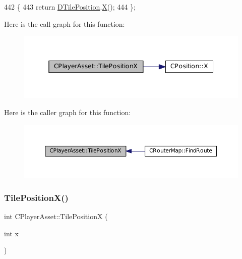 \begin{DoxyCode}
442                                  \{
443             \textcolor{keywordflow}{return} \hyperlink{classCPlayerAsset_a5b59a9d3b7db8c7fa194b80dafb96186}{DTilePosition}.\hyperlink{classCPosition_a9a6b94d3b91df1492d166d9964c865fc}{X}();  
444         \};
\end{DoxyCode}
Here is the call graph for this function\+:\nopagebreak
\begin{figure}[H]
\begin{center}
\leavevmode
\includegraphics[width=345pt]{classCPlayerAsset_aeabaa8fe7161cce571b6c4d2f7180085_cgraph}
\end{center}
\end{figure}
Here is the caller graph for this function\+:\nopagebreak
\begin{figure}[H]
\begin{center}
\leavevmode
\includegraphics[width=350pt]{classCPlayerAsset_aeabaa8fe7161cce571b6c4d2f7180085_icgraph}
\end{center}
\end{figure}
\hypertarget{classCPlayerAsset_ad3a0b4bafbfa9021b59925a5c3364cd5}{}\label{classCPlayerAsset_ad3a0b4bafbfa9021b59925a5c3364cd5} 
\subsubsection{\texorpdfstring{Tile\+Position\+X()}{TilePositionX()}\hspace{0.1cm}{\footnotesize\ttfamily [2/2]}}
{\footnotesize\ttfamily int C\+Player\+Asset\+::\+Tile\+PositionX (\begin{DoxyParamCaption}\item[{int}]{x }\end{DoxyParamCaption})}



